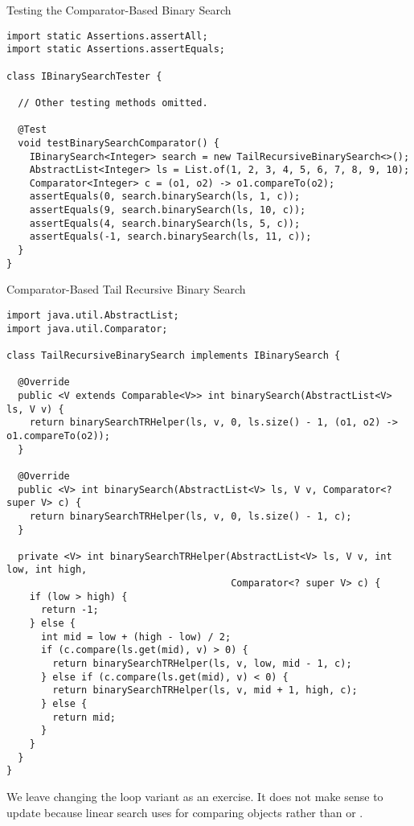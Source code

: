 \begin{cl}{Testing the Comparator-Based Binary Search}
\begin{lstlisting}[language=MyJava]
import static Assertions.assertAll;
import static Assertions.assertEquals;

class IBinarySearchTester {

  // Other testing methods omitted.

  @Test
  void testBinarySearchComparator() {
    IBinarySearch<Integer> search = new TailRecursiveBinarySearch<>();
    AbstractList<Integer> ls = List.of(1, 2, 3, 4, 5, 6, 7, 8, 9, 10);
    Comparator<Integer> c = (o1, o2) -> o1.compareTo(o2);
    assertEquals(0, search.binarySearch(ls, 1, c));
    assertEquals(9, search.binarySearch(ls, 10, c));
    assertEquals(4, search.binarySearch(ls, 5, c));
    assertEquals(-1, search.binarySearch(ls, 11, c));
  }
}
\end{lstlisting}
\end{cl}

\begin{cl}{Comparator-Based Tail Recursive Binary Search}
\begin{lstlisting}[language=MyJava]
import java.util.AbstractList;
import java.util.Comparator;

class TailRecursiveBinarySearch implements IBinarySearch {
  
  @Override
  public <V extends Comparable<V>> int binarySearch(AbstractList<V> ls, V v) {
    return binarySearchTRHelper(ls, v, 0, ls.size() - 1, (o1, o2) -> o1.compareTo(o2));
  }
  
  @Override
  public <V> int binarySearch(AbstractList<V> ls, V v, Comparator<? super V> c) {
    return binarySearchTRHelper(ls, v, 0, ls.size() - 1, c);
  }
  
  private <V> int binarySearchTRHelper(AbstractList<V> ls, V v, int low, int high,
                                       Comparator<? super V> c) {
    if (low > high) { 
      return -1; 
    } else {
      int mid = low + (high - low) / 2;
      if (c.compare(ls.get(mid), v) > 0) { 
        return binarySearchTRHelper(ls, v, low, mid - 1, c); 
      } else if (c.compare(ls.get(mid), v) < 0) { 
        return binarySearchTRHelper(ls, v, mid + 1, high, c); 
      } else { 
        return mid; 
      }
    }
  }
}
\end{lstlisting}
\end{cl}

We leave changing the loop variant as an exercise. It does not make sense to update  because linear search uses  for comparing objects rather than  or .